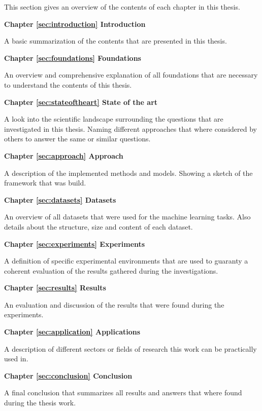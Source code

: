 This section gives an overview of the contents of each chapter in this thesis.

\textbf{Chapter \ref{sec:introduction} Introduction}

A basic summarization of the contents that are presented in this thesis.

\textbf{Chapter \ref{sec:foundations} Foundations}

An overview and comprehensive explanation of all foundations that are necessary to understand the contents of this thesis.

\textbf{Chapter \ref{sec:stateoftheart} State of the art}

A look into the scientific landscape surrounding the questions that are investigated in this thesis.
Naming different approaches that where considered by others to answer the same or similar questions.

\textbf{Chapter \ref{sec:approach} Approach}

A description of the implemented methods and models. Showing a sketch of the framework that was build.

\textbf{Chapter \ref{sec:datasets} Datasets}

An overview of all datasets that were used for the machine learning tasks. Also details about the structure, size and content of each dataset.

\textbf{Chapter \ref{sec:experiments} Experiments}

A definition of specific experimental environments that are used to guaranty a coherent evaluation of the results gathered during 
the investigations.

\textbf{Chapter \ref{sec:results} Results}

An evaluation and discussion of the results that were found during the experiments.

\textbf{Chapter \ref{sec:application} Applications}

A description of different sectors or fields of research this work can be practically used in. 

\textbf{Chapter \ref{sec:conclusion} Conclusion}

A final conclusion that summarizes all results and answers that where found during the thesis work.



